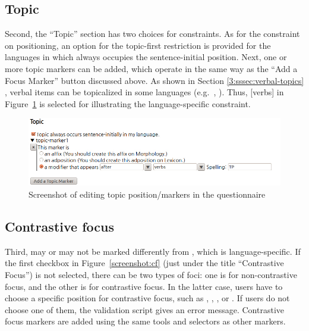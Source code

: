 \subsection{Topic}
\label{11:ssec:questionnaire-topic}


Second, the ``Topic'' section has two choices for constraints. As for
the constraint on positioning, an option for the topic-first
restriction is provided for the languages in which  always
occupies the sentence-initial position. Next, one or more topic
markers can be added, which operate in the same way as the ``Add a
Focus Marker'' button discussed above.  As shown in
Section \ref{3:sssec:verbal-topics} , verbal
items can be topicalized in some languages
(e.g.\ , \citealt{chapman:81}).  Thus, [verbs] in
Figure~\ref{screenshot:topic} is selected for illustrating the
language-specific constraint.

\begin{figure}[!t]
\begin{center} 
\includegraphics[width=.9\textwidth]{screenshot/topic.jpg}
\caption{Screenshot of editing topic position/markers in the questionnaire}
\label{screenshot:topic}
\end{center}
\end{figure}





\subsection{Contrastive focus}
\label{11:ssec:questionnaire-cf}

Third,  may or may not be marked differently
from , which is language-specific. If the
first checkbox in Figure~\ref{screenshot:cf} (just under the title
``Contrastive Focus'') is not selected, there can be two types of
foci: one is  for non-contrastive focus, and the
other is  for contrastive focus. In the latter
case, users have to choose a specific position for contrastive focus,
such as , , , or
. If users do not choose one of them, the validation
script gives an error message.  Contrastive focus markers are added
using the same tools and selectors as other markers.


